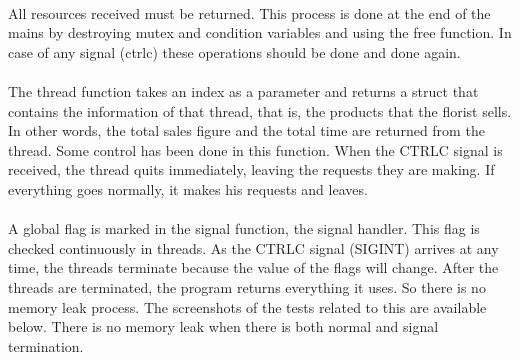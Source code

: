 \documentclass{article}
\begin{document}
\paragraph{}
All resources received must be returned. This process is done at the end of the mains by destroying mutex and condition variables and using the free function. In case of any signal (ctrlc) these operations should be done and done again.

\paragraph{}
The thread function takes an index as a parameter and returns a struct that contains the information of that thread, that is, the products that the florist sells. In other words, the total sales figure and the total time are returned from the thread. Some control has been done in this function. When the CTRLC signal is received, the thread quits immediately, leaving the requests they are making. If everything goes normally, it makes his requests and leaves.

\paragraph{}
A global flag is marked in the signal function, the signal handler. This flag is checked continuously in threads. As the CTRLC signal (SIGINT) arrives at any time, the threads terminate because the value of the flags will change. After the threads are terminated, the program returns everything it uses. So there is no memory leak process. The screenshots of the tests related to this are available below. There is no memory leak when there is both normal and signal termination.
\end{document}
